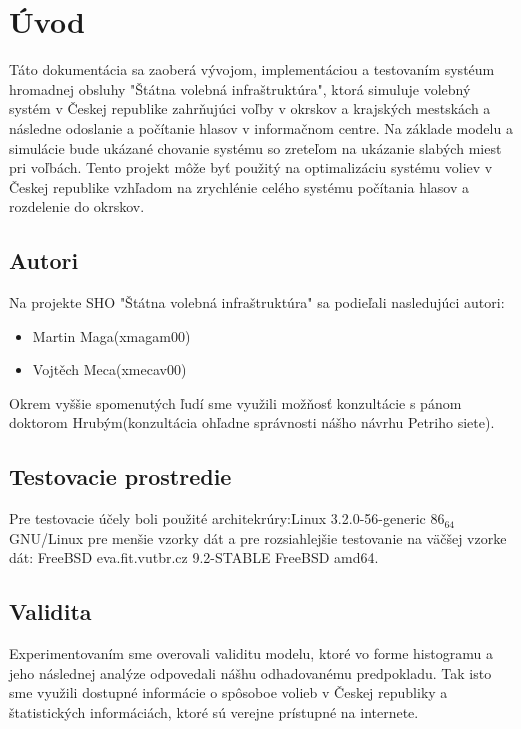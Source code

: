 \documentclass[12pt,a4paper,titlepage,final]{article}
\begin{document}


\tableofcontents
\newpage

\section{Úvod}
Táto dokumentácia sa zaoberá vývojom, implementáciou a testovaním systéum hromadnej obsluhy "Štátna volebná infraštruktúra", ktorá simuluje volebný systém v Českej republike zahrňujúci voľby v okrskov a krajských mestskách a následne odoslanie a počítanie hlasov v informačnom centre.
\indent
Na základe modelu a simulácie bude ukázané chovanie systému so zreteľom na ukázanie slabých miest pri voľbách. Tento projekt môže byť použitý na optimalizáciu systému voliev v Českej republike vzhľadom na zrychlénie celého systému počítania hlasov a rozdelenie do okrskov.

\subsection{Autori}
Na projekte SHO "Štátna volebná infraštruktúra" sa podieľali nasledujúci autori:
\begin{itemize}
\item Martin Maga(xmagam00)
\item Vojtěch Meca(xmecav00)
\end{itemize}

Okrem vyššie spomenutých ľudí sme využili možňosť konzultácie s pánom doktorom Hrubým(konzultácia ohľadne správnosti nášho návrhu Petriho siete).

\subsection{Testovacie prostredie}
Pre testovacie účely boli použité architekrúry:Linux 3.2.0-56-generic $86_64$ GNU/Linux pre menšie vzorky dát a pre rozsiahlejšie testovanie na väčšej vzorke dát: FreeBSD eva.fit.vutbr.cz 9.2-STABLE FreeBSD amd64.

\subsection{Validita}
Experimentovaním sme overovali validitu modelu, ktoré vo forme histogramu a jeho následnej analýze odpovedali nášhu odhadovanému predpokladu. Tak isto sme využili dostupné informácie o spôsoboe volieb v Českej republiky a štatistických informáciách, ktoré sú verejne prístupné na internete.
\end{document}
